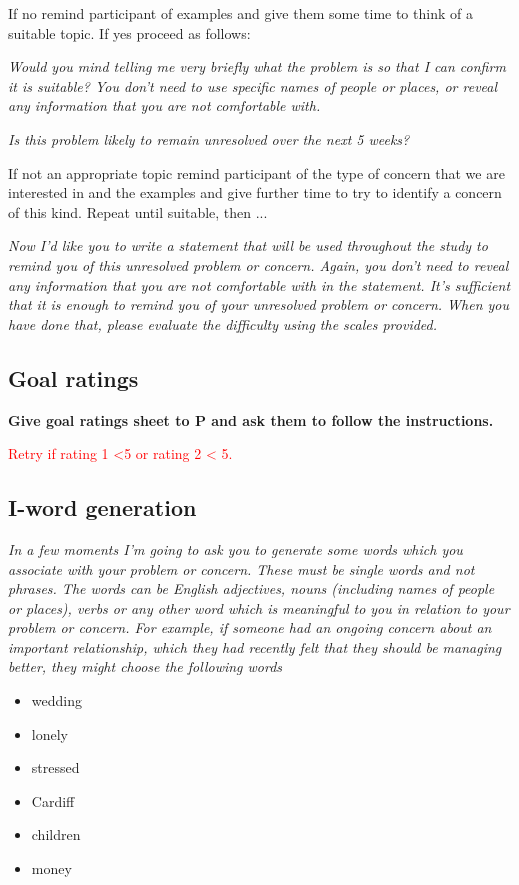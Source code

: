 If no remind participant of examples and give them some time to think of a suitable topic. If yes proceed as follows:

\textit{Would you mind telling me very briefly what the problem is
so that I can confirm it is suitable? You don't need to use specific
names of people or places, or reveal any information that you are not
comfortable with.}

\textit{Is this problem likely to remain unresolved over the next 5 weeks?}

If not an appropriate topic remind participant of the type of concern that we are interested in and the examples and
give further time to try to identify a concern of this kind. Repeat until suitable, then ...

\textit{Now I'd like you to write a statement that will be used throughout
the study to remind you of this unresolved problem or concern. Again,
you don't need to reveal any information that you are not comfortable
with in the statement. It's sufficient that it is enough to remind you
of your unresolved problem or concern. When you have done that, please
evaluate the difficulty using the scales provided.}

\subsection{Goal ratings}

\textbf{Give goal ratings sheet to P and ask them to follow the instructions.}

\textcolor{red}{Retry if rating 1 {\textless}5 or rating 2 {\textless} 5.}

\subsection{I-word generation}

\textit{In a few moments I'm going to ask you to generate some words which you associate with your
problem or concern. These must be single words and not phrases. The words can be English adjectives, nouns
(including names of people or places), verbs or any other word which is meaningful to you in relation to your problem
or concern. For example, if someone had an ongoing concern about an important relationship, which they had recently
felt that they should be managing better, they might choose the following words}

\begin{itemize}
\item {wedding}
\item {lonely}
\item {stressed}
\item {Cardiff}
\item {children}
\item {money}
\end{itemize}

